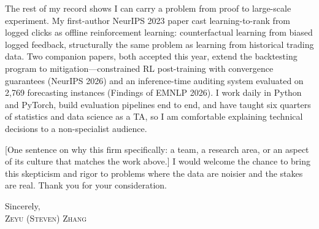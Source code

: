 \documentclass[10.5pt]{article}
\begin{document}
The rest of my record shows I can carry a problem from proof to large-scale
experiment. My first-author NeurIPS 2023 paper cast learning-to-rank from logged
clicks as offline reinforcement learning: counterfactual learning from biased
logged feedback, structurally the same problem as learning from historical trading
data. Two companion papers, both accepted this year, extend the backtesting program
to mitigation---constrained RL post-training with convergence guarantees (NeurIPS
2026) and an inference-time auditing system evaluated on 2{,}769 forecasting
instances (Findings of EMNLP 2026). I work daily in Python and PyTorch, build evaluation
pipelines end to end, and have taught six quarters of statistics and data science
as a TA, so I am comfortable explaining technical decisions to a non-specialist
audience.

[One sentence on why this firm specifically: a team, a research area, or an aspect
of its culture that matches the work above.] I would welcome the chance to bring
this skepticism and rigor to problems where the data are noisier and the stakes are
real. Thank you for your consideration.

\vspace{6pt}
Sincerely,\\[2pt]
{\scshape Zeyu (Steven) Zhang}
\end{document}
